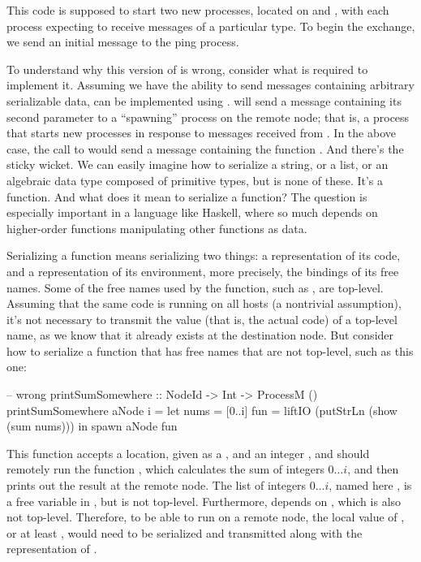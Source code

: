 \documentclass[preprint]{sigplanconf}
\begin{document}
This code is supposed to start two new processes, located on  and , with each process expecting to receive messages of a particular type. To begin the exchange, we send an initial  message to the ping process.

To understand why this version of  is wrong, consider what is required to  implement it. Assuming we have the ability to send messages containing arbitrary serializable data,  can be implemented using .   will send a message containing its second parameter to a ``spawning'' process on the remote node; that is, a process that starts new processes in response to messages received from . In the above case, the call to  would send a message containing the function . And there's the sticky wicket. We can easily imagine how to serialize a string, or a list, or an algebraic data type composed of primitive types, but  is none of these. It's a function. And what does it mean to serialize a function? The question is especially important in a language like Haskell, where so much depends on higher-order functions manipulating other functions as data.

Serializing a function means serializing two things: a representation of its code, and a representation of its environment, more precisely, the bindings of its free names. Some of the free names used by the  function, such as , are top-level. Assuming that the same code is running on all hosts (a nontrivial assumption), it's not necessary to transmit the value (that is, the actual code) of a top-level name, as we know that it already exists at the destination node. But consider how to serialize a function that has free names that are not top-level, such as this one:

\begin{code}
-- wrong
printSumSomewhere :: NodeId -> Int -> ProcessM ()
printSumSomewhere aNode i =
  let nums = [0..i]
      fun = liftIO (putStrLn (show (sum nums)))
   in spawn aNode fun
\end{code}

This function accepts a location, given as a , and an integer , and should remotely run the function , which calculates the sum of integers $0 \ldots i$, and then prints out the result at the remote node. The list of integers $0 \ldots i$, named here , is a free variable in , but is not top-level. Furthermore,  depends on , which is also not top-level. Therefore, to be able to run  on a remote node, the local value of , or at least , would need to be serialized and transmitted along with the representation of .
\end{document}
